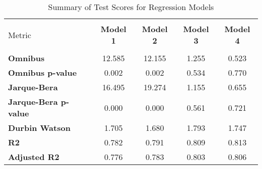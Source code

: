 
    \begin{table}
        \centering
        \caption{Summary of Test Scores for Regression Models}
        \vspace{10pt}
        \label{tab:test_scores}
        \begin{tabular}{lcccc}
        \hline
        \hline \\[-1.8ex]
    Metric & \textbf{Model 1} & \textbf{Model 2} & \textbf{Model 3} & \textbf{Model 4} \\
\hline \\[-1.8ex] 
\textbf{Omnibus} & 12.585 & 12.155 & 1.255 & 0.523 \\
\textbf{Omnibus p-value} & 0.002 & 0.002 & 0.534 & 0.770 \\
\textbf{Jarque-Bera} & 16.495 & 19.274 & 1.155 & 0.655 \\
\textbf{Jarque-Bera p-value} & 0.000 & 0.000 & 0.561 & 0.721 \\
\textbf{Durbin Watson} & 1.705 & 1.680 & 1.793 & 1.747 \\
\textbf{R2} & 0.782 & 0.791 & 0.809 & 0.813 \\
\textbf{Adjusted R2} & 0.776 & 0.783 & 0.803 & 0.806 \\

        \hline
        \hline
        \end{tabular}
    \end{table}
    
